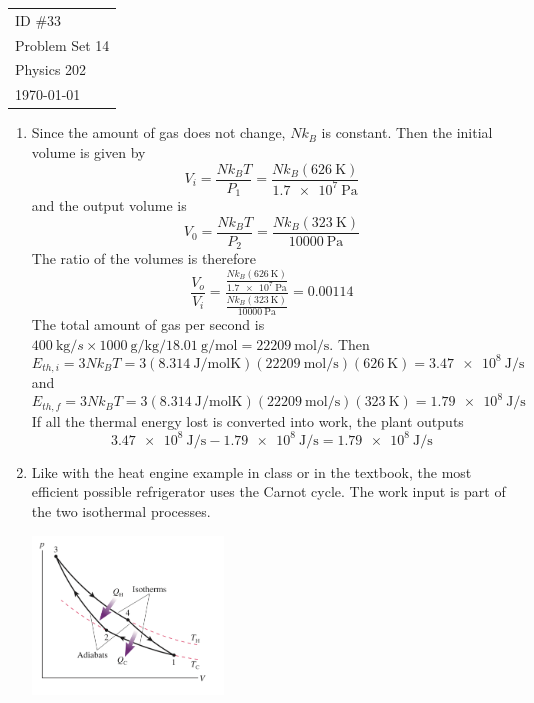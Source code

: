 \documentclass[fleqn]{article}[12pt]
\begin{document}
    \begin{tabular}{l}
        ID \#33 \\
        Problem Set 14 \\
        Physics 202 \\
        \today
    \end{tabular}

\begin{enumerate}
    \item Since the amount of gas does not change, $Nk_B$ is constant. Then the initial volume is given by
    \begin{equation*}
        V_i = \frac{Nk_B T}{P_1} = \frac{Nk_B(\SI{626}{\kelvin})}{\SI{1.7e7}{\pascal}}
    \end{equation*}
    and the output volume is
    \begin{equation*}
        V_0 = \frac{Nk_B T}{P_2} = \frac{Nk_B(\SI{323}{\kelvin})}{\SI{10000}{\pascal}}
    \end{equation*}
    The ratio of the volumes is therefore
    \begin{equation*}
        \frac{V_o}{V_i} = \frac{\frac{Nk_B(\SI{626}{\kelvin})}{\SI{1.7e7}{\pascal}}}{\frac{Nk_B(\SI{323}{\kelvin})}{\SI{10000}{\pascal}}} =
        0.00114
    \end{equation*}
    The total amount of gas per second is $\SI{400}{\kg/s} \times \SI{1000}{\g/\kg} / \SI{18.01}{\g/\mol} = \SI{22209}{\mol/\s}$. Then
    \begin{equation*}
        E_{th,i} = 3 Nk_B T = 3 (\SI{8.314}{\joule/\mol\kelvin})(\SI{22209}{\mol/\s}) (\SI{626}{\kelvin}) = \SI{3.47e8}{\joule/\s}
    \end{equation*}
    and
    \begin{equation*}
        E_{th,f} = 3 Nk_B T = 3 (\SI{8.314}{\joule/\mol\kelvin})(\SI{22209}{\mol/\s}) (\SI{323}{\kelvin}) = \SI{1.79e8}{\joule/\s}
    \end{equation*}
    If all the thermal energy lost is converted into work, the plant outputs
    \begin{equation*}
        \SI{3.47e8}{\joule/\s} - \SI{1.79e8}{\joule/\s} = \SI{1.79e8}{\joule/\s}
    \end{equation*}

    \item Like with the heat engine example in class or in the textbook, the most efficient possible refrigerator uses the Carnot cycle. The work input is part of the two isothermal processes.

    \includegraphics[width=0.4\textwidth]{carnot}


\end{enumerate}
\end{document}
